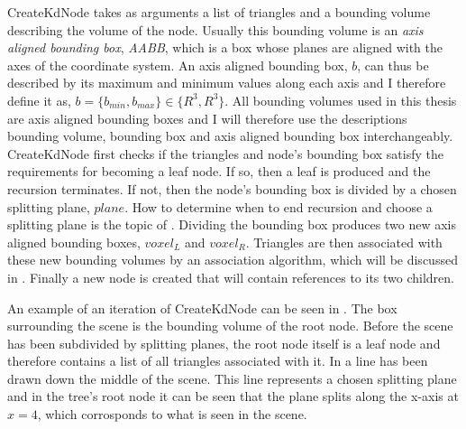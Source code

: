 CreateKdNode takes as arguments a list of triangles and a bounding volume
describing the volume of the node. Usually this bounding volume is an
\textit{axis aligned bounding box}, \textit{AABB}, which is a box whose planes
are aligned with the axes of the coordinate system. An axis aligned bounding
box, $b$, can thus be described by its maximum and minimum values along each
axis and I therefore define it as, $b = \{b_{min}, b_{max}\} \in \{R^3,
R^3\}$. All bounding volumes used in this thesis are axis aligned bounding boxes
and I will therefore use the descriptions bounding volume, bounding box and axis
aligned bounding box interchangeably. CreateKdNode first checks if the
triangles and node's bounding box satisfy the requirements for becoming a leaf
node. If so, then a leaf is produced and the recursion terminates. If not, then
the node's bounding box is divided by a chosen splitting plane, $plane$. How to
determine when to end recursion and choose a splitting plane is the topic of
. Dividing the bounding box produces two new axis
aligned bounding boxes, $voxel_L$ and $voxel_R$. Triangles are then associated
with these new bounding volumes by an association algorithm, which will be
discussed in . Finally a new node is created
that will contain references to its two children.

An example of an iteration of CreateKdNode can be seen in
. The box surrounding the scene is the bounding volume
of the root node. Before the scene has been subdivided by splitting planes, the
root node itself is a leaf node and therefore contains a list of all triangles
associated with it. In  a line has been drawn down the
middle of the scene. This line represents a chosen splitting plane and in the
tree's root node it can be seen that the plane splits along the x-axis at $x=4$,
which corrosponds to what is seen in the scene.

